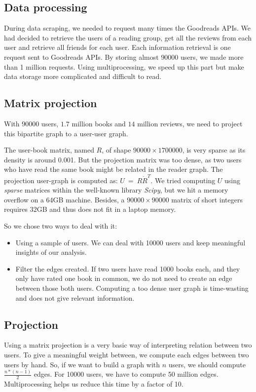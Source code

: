 \documentclass[11pt]{article}
\begin{document}
\subsection{Data processing}

During data scraping, we needed to request many times the Goodreads APIs.
We had decided to retrieve the users of a reading group, get all the reviews from each user and retrieve all friends for each user.
Each information retrieval is one request sent to Goodreads APIs.
By storing almost $90000$ users, we made more than 1 million requests. Using multiprocessing, we speed up this part but make data storage more complicated and difficult to read.

\subsection{Matrix projection}

With $90000$ users, $1.7$ million books and $14$ million reviews, we need to project this bipartite graph to a user-user graph.

The user-book matrix, named $R$, of shape $90000 \times 1700000$, is very sparse as its density is around 0.001. But the projection matrix was too dense, as two users who have read the same book might be related in the reader graph.
The projection user-graph is computed as: $U~=~R \dot R^T$.
We tried computing $U$ using \emph{sparse} matrices within the well-known library \emph{Scipy}\cite{scipy}, but we hit a memory overflow on a 64GB machine.
Besides, a $90000 \times 90000$ matrix of short integers requires $32$GB and thus does not fit in a laptop memory.

So we chose two ways to deal with it:
\begin{itemize}
\item Using a sample of users. We can deal with 10000 users and keep meaningful insights of our analysis.
\item Filter the edges created. If two users have read 1000 books each, and they only have rated one book in common, we do not need to create an edge between those both users. Computing a too dense user graph is time-wasting and does not give relevant information.
\end{itemize}

\subsection{Projection}

Using a matrix projection is a very basic way of interpreting relation between two users. To give a meaningful weight between, we compute each edges between two users by hand. So, if we want to build a graph with $n$ users, we should compute $\frac{n * (n-1)}{2}$ edges. 
For 10000 users, we have to compute 50 million edges. Multiprocessing helps us reduce this time by a factor of 10.
\end{document}
